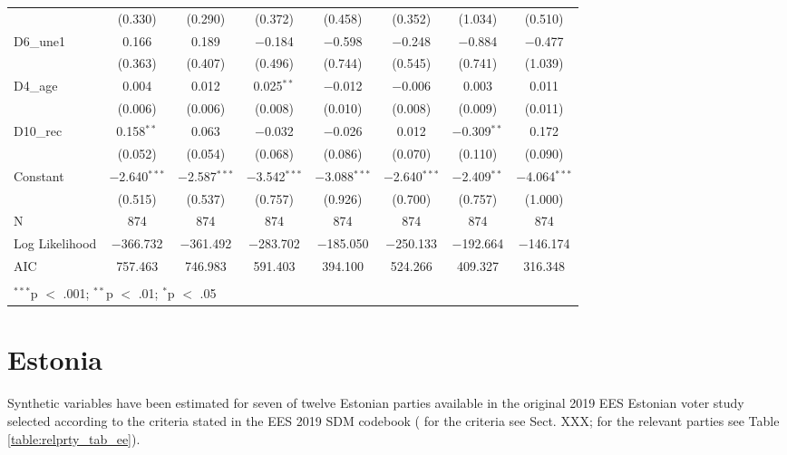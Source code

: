 \documentclass[
]{article}
\begin{document}
\begin{table}[!htbp]
\begin{tabular}{@{\extracolsep{5pt}}lccccccc}
  & (0.330) & (0.290) & (0.372) & (0.458) & (0.352) & (1.034) & (0.510) \\ 
  D6\_une1 & 0.166 & 0.189 & $-$0.184 & $-$0.598 & $-$0.248 & $-$0.884 & $-$0.477 \\ 
  & (0.363) & (0.407) & (0.496) & (0.744) & (0.545) & (0.741) & (1.039) \\ 
  D4\_age & 0.004 & 0.012 & 0.025$^{**}$ & $-$0.012 & $-$0.006 & 0.003 & 0.011 \\ 
  & (0.006) & (0.006) & (0.008) & (0.010) & (0.008) & (0.009) & (0.011) \\ 
  D10\_rec & 0.158$^{**}$ & 0.063 & $-$0.032 & $-$0.026 & 0.012 & $-$0.309$^{**}$ & 0.172 \\ 
  & (0.052) & (0.054) & (0.068) & (0.086) & (0.070) & (0.110) & (0.090) \\ 
  Constant & $-$2.640$^{***}$ & $-$2.587$^{***}$ & $-$3.542$^{***}$ & $-$3.088$^{***}$ & $-$2.640$^{***}$ & $-$2.409$^{**}$ & $-$4.064$^{***}$ \\ 
  & (0.515) & (0.537) & (0.757) & (0.926) & (0.700) & (0.757) & (1.000) \\ 
 N & 874 & 874 & 874 & 874 & 874 & 874 & 874 \\ 
Log Likelihood & $-$366.732 & $-$361.492 & $-$283.702 & $-$185.050 & $-$250.133 & $-$192.664 & $-$146.174 \\ 
AIC & 757.463 & 746.983 & 591.403 & 394.100 & 524.266 & 409.327 & 316.348 \\ 
\hline \\[-1.8ex] 
\multicolumn{8}{l}{$^{***}$p $<$ .001; $^{**}$p $<$ .01; $^{*}$p $<$ .05} \\ 
\end{tabular} 
\end{table}

\clearpage

\newpage

\hypertarget{estonia}{%
\section{Estonia}\label{estonia}}

Synthetic variables have been estimated for seven of twelve Estonian parties available in the original
2019 EES Estonian voter study selected according to the criteria stated in the EES 2019 SDM codebook (
for the criteria see Sect. XXX; for the relevant parties see Table \ref{table:relprty_tab_ee}).
\end{document}
